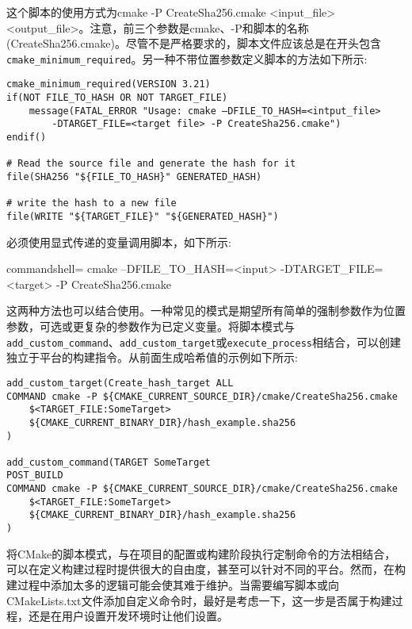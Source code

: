 这个脚本的使用方式为cmake -P CreateSha256.cmake <input\_file> <output\_file>。注意，前三个参数是cmake、-P和脚本的名称(CreateSha256.cmake)。尽管不是严格要求的，脚本文件应该总是在开头包含\texttt{cmake\_minimum\_required}。另一种不带位置参数定义脚本的方法如下所示:

\begin{lstlisting}[style=styleCMake]
cmake_minimum_required(VERSION 3.21)
if(NOT FILE_TO_HASH OR NOT TARGET_FILE)
	message(FATAL_ERROR "Usage: cmake –DFILE_TO_HASH=<intput_file> 
		-DTARGET_FILE=<target file> -P CreateSha256.cmake")
endif()

# Read the source file and generate the hash for it
file(SHA256 "${FILE_TO_HASH}" GENERATED_HASH)

# write the hash to a new file
file(WRITE "${TARGET_FILE}" "${GENERATED_HASH}")
\end{lstlisting}

必须使用显式传递的变量调用脚本，如下所示:

\begin{tcblisting}{commandshell={}}
cmake –DFILE_TO_HASH=<input>
      -DTARGET_FILE=<target> -P CreateSha256.cmake
\end{tcblisting}

这两种方法也可以结合使用。一种常见的模式是期望所有简单的强制参数作为位置参数，可选或更复杂的参数作为已定义变量。将脚本模式与\texttt{add\_custom\_command}、\texttt{add\_custom\_target}或\texttt{execute\_process}相结合，可以创建独立于平台的构建指令。从前面生成哈希值的示例如下所示:

\begin{lstlisting}[style=styleCMake]
add_custom_target(Create_hash_target ALL
COMMAND cmake -P ${CMAKE_CURRENT_SOURCE_DIR}/cmake/CreateSha256.cmake
	$<TARGET_FILE:SomeTarget>
	${CMAKE_CURRENT_BINARY_DIR}/hash_example.sha256
)

add_custom_command(TARGET SomeTarget
POST_BUILD
COMMAND cmake -P ${CMAKE_CURRENT_SOURCE_DIR}/cmake/CreateSha256.cmake
	$<TARGET_FILE:SomeTarget>
	${CMAKE_CURRENT_BINARY_DIR}/hash_example.sha256
)
\end{lstlisting}

将CMake的脚本模式，与在项目的配置或构建阶段执行定制命令的方法相结合，可以在定义构建过程时提供很大的自由度，甚至可以针对不同的平台。然而，在构建过程中添加太多的逻辑可能会使其难于维护。当需要编写脚本或向CMakeLists.txt文件添加自定义命令时，最好是考虑一下，这一步是否属于构建过程，还是在用户设置开发环境时让他们设置。






























